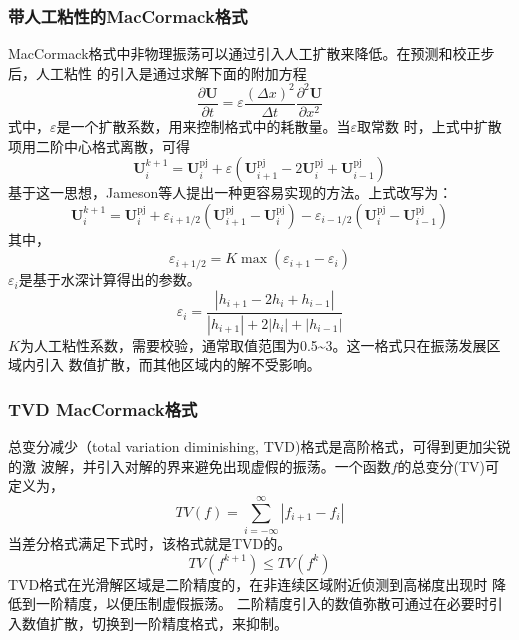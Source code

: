 \subsubsection{带人工粘性的MacCormack格式}
MacCormack格式中非物理振荡可以通过引入人工扩散来降低。在预测和校正步后，人工粘性
的引入是通过求解下面的附加方程
\begin{equation}
  \frac{\partial \mathbf{U}}{\partial t} =
  \varepsilon
  \frac{(\Delta x)^{2}}{\Delta t}
  \frac{{\partial}^{2}\mathbf{U}}{\partial x^{2}}
\end{equation}
式中，$\varepsilon$是一个扩散系数，用来控制格式中的耗散量。当$\varepsilon$取常数
时，上式中扩散项用二阶中心格式离散，可得
\begin{equation}
  \mathbf{U}_{i}^{k+1} =
  \mathbf{U}_{i}^{\mathrm{pj}} +
  \varepsilon
  (
  \mathbf{U}_{i+1}^{\mathrm{pj}} - 
  2\mathbf{U}_{i}^{\mathrm{pj}} +
  \mathbf{U}_{i-1}^{\mathrm{pj}}
  )
\end{equation}
基于这一思想，Jameson等人提出一种更容易实现的方法。上式改写为：
\begin{equation}
  \mathbf{U}_{i}^{k+1} =
  \mathbf{U}_{i}^{\mathrm{pj}} +
  {\varepsilon}_{i+1/2}
  (
  \mathbf{U}_{i+1}^{\mathrm{pj}} - 
  \mathbf{U}_{i}^{\mathrm{pj}}
  )
  -
  {\varepsilon}_{i-1/2}
  (
  \mathbf{U}_{i}^{\mathrm{pj}} -
  \mathbf{U}_{i-1}^{\mathrm{pj}}
  )
\end{equation}
其中，
\begin{equation}
  {\varepsilon}_{i+1/2} =
  K\max({\varepsilon}_{i+1}-{\varepsilon}_{i})
\end{equation}
${\varepsilon}_{i}$是基于水深计算得出的参数。
\begin{equation}
  {\varepsilon}_{i} =
  \frac{|h_{i+1}-2h_{i}+h_{i-1}|}{|h_{i+1}|+2|h_{i}|+|h_{i-1}|}
\end{equation}
$K$为人工粘性系数，需要校验，通常取值范围为0.5\textasciitilde 3。这一格式只在振荡发展区域内引入
数值扩散，而其他区域内的解不受影响。

\subsubsection{TVD MacCormack格式}
总变分减少（total variation diminishing, TVD)格式是高阶格式，可得到更加尖锐的激
波解，并引入对解的界来避免出现虚假的振荡。一个函数$f$的总变分(TV)可定义为，
\begin{equation}
  TV(f) =
  \sum_{i=-\infty}^{\infty}
  |{f}_{i+1} - {f}_{i}|
\end{equation}
当差分格式满足下式时，该格式就是TVD的。
\begin{equation}
  TV({f}^{k+1}) \le TV({f}^{k})
\end{equation}
TVD格式在光滑解区域是二阶精度的，在非连续区域附近侦测到高梯度出现时
降低到一阶精度，以便压制虚假振荡。
二阶精度引入的数值弥散可通过在必要时引入数值扩散，切换到一阶精度格式，来抑制。

